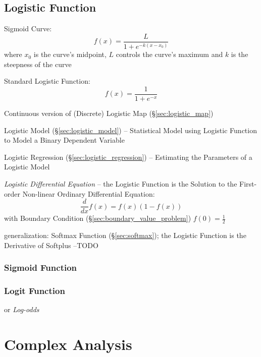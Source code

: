 \subsection{Logistic Function}\label{sec:logistic_function}


Sigmoid Curve:
\[
  f(x) = \frac{L}{1 + e^{-k(x-x_0)}}
\]
where $x_0$ is the curve's midpoint, $L$ controls the curve's maximum and $k$ is
the steepness of the curve

Standard Logistic Function:
\[
  f(x) = \frac{1}{1 + e^{-x}}
\]

\fist Continuous version of (Discrete) Logistic Map (\S\ref{sec:logistic_map})

\fist Logistic Model (\S\ref{sec:logistic_model}) -- Statistical Model using
Logistic Function to Model a Binary Dependent Variable

\fist Logistic Regression (\S\ref{sec:logistic_regression}) -- Estimating the
Parameters of a Logistic Model

\emph{Logistic Differential Equation} -- the Logistic Function is the Solution
to the First-order Non-linear Ordinary Differential Equation:
\[
  \frac{d}{dx}f(x) = f(x)(1 - f(x))
\]
with Boundary Condition (\S\ref{sec:boundary_value_problem}) $f(0) =
\frac{1}{2}$

\fist generalization: Softmax Function (\S\ref{sec:softmax}); the Logistic
Function is the Derivative of Softplus --TODO



\subsubsection{Sigmoid Function}\label{sec:sigmoid_function}

\subsubsection{Logit Function}\label{sec:logit_function}

or \emph{Log-odds}



\section{Complex Analysis}\label{sec:complex_analysis}

